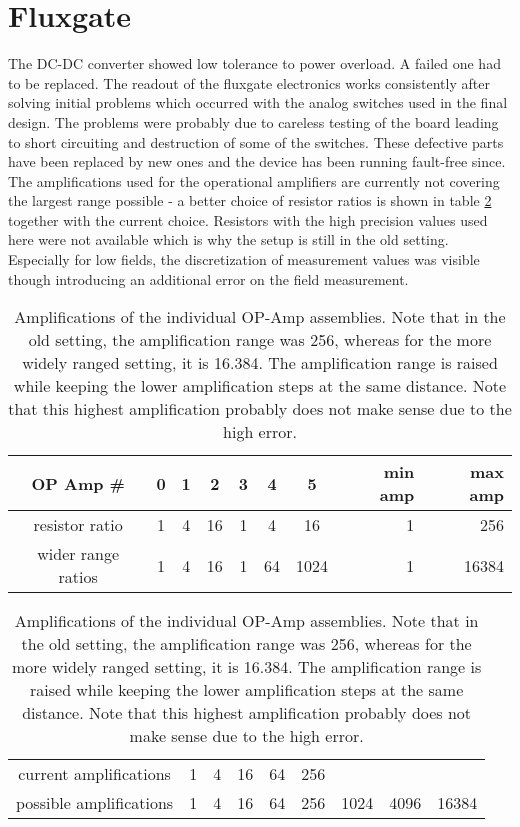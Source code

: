    \section{Fluxgate}
        The DC-DC converter showed low tolerance to power overload. A failed one had to be replaced.
        The readout of the fluxgate electronics works consistently after solving initial problems which occurred with the analog switches used in the final design. The problems were probably due to careless testing of the board leading to short circuiting and destruction of some of the switches. These defective parts have been replaced by new ones and the device has been running fault-free since.
        The amplifications used for the operational amplifiers are currently not covering the largest range possible - a better choice of resistor ratios is shown in table \ref{table:discussion:amplifications} together with the current choice.  Resistors with the high precision values used here were not available which is why the setup is still in the old setting. Especially for low fields, the discretization of measurement values was visible though introducing an additional error on the field measurement.
        \begin{table}
            \centering
            \begin{tabular}{|c|ccc|ccc||rr|}
                \hline
                OP Amp \# & 0 & 1 & 2 & 3 & 4 & 5 & min amp& max amp\\
                \hline
                resistor ratio & 1 & 4 & 16 & 1 & 4 & 16 & 1 & 256\\
                wider range ratios & 1 & 4 & 16 & 1 & 64 & 1024& 1 & 16384\\
                \hline
            \end{tabular}
            \begin{tabular}{|c|cccccccc|}
                \hline
                current amplifications & 1 & 4 & 16 & 64 & 256 & & & \\
                possible amplifications & 1 & 4 & 16 & 64 & 256 & 1024 & 4096 & 16384\\
                \hline
            \end{tabular}
            \caption[OP-AMP amplifications]{Amplifications of the individual OP-Amp assemblies. Note that in the old setting, the amplification range was 256, whereas for the more widely ranged setting, it is 16.384. The amplification range is raised while keeping the lower amplification steps at the same distance. Note that this highest amplification probably does not make sense due to the high error.}
            \label{table:discussion:amplifications}
        \end{table}
